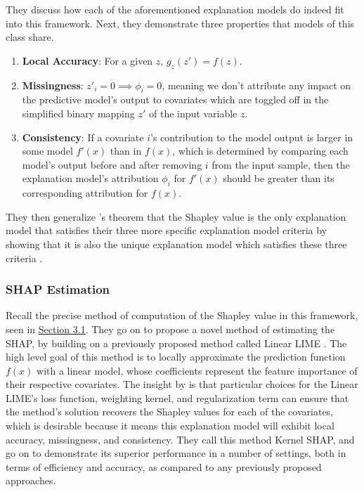 They discuss how each of the aforementioned explanation models do indeed fit into this framework. Next, they demonstrate three properties that models of this class share.

\begin{enumerate}
    \item \textbf{Local Accuracy}: For a given $z$, $g_z(z') = f(z)$.
    \item \textbf{Missingness}: $z'_i = 0 \implies \phi_i = 0$, meaning we don't attribute any impact on the predictive model's output to covariates which are toggled off in the simplified binary mapping $z'$ of the input variable $z$.
    \item \textbf{Consistency}: If a covariate $i$'s contribution to the model output is larger in some model $f'(x)$ than in $f(x)$, which is determined by comparing each model's output before and after removing $i$ from the input sample, then the explanation model's attribution $\phi_i$ for $f'(x)$ should be greater than its corresponding attribution for $f(x)$.
\end{enumerate}

They then generalize \citet{QII_MS3}'s theorem that the Shapley value is the only explanation model that satisfies their three more specific explanation model criteria by showing that it is also the unique explanation model which satisfies these three criteria \citep{microsoftPaper}.

\subsubsection{SHAP Estimation}

Recall the precise method of computation of the Shapley value in this framework, seen in \hyperref[sec:history]{Section 3.1}. They go on to propose a novel method of estimating the SHAP, by building on a previously proposed method called Linear LIME \citep{ribeiroSG16_MS5}. The high level goal of this method is to locally approximate the prediction function $f(x)$ with a linear model, whose coefficients represent the feature importance of their respective covariates. The insight by \citet{microsoftPaper} is that particular choices for the Linear LIME's loss function, weighting kernel, and regularization term can ensure that the method's solution recovers the Shapley values for each of the covariates, which is desirable because it means this explanation model will exhibit local accuracy, missingness, and consistency. They call this method Kernel SHAP, and go on to demonstrate its superior performance in a number of settings, both in terms of efficiency and accuracy, as compared to any previously proposed approaches.

